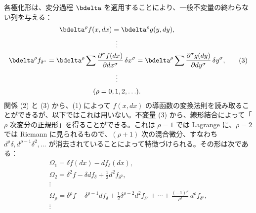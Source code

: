 各極化形は、変分過程 \(\bdelta\) を適用することにより、一般不変量の終わらない列を与える：
\begin{equation}
\begin{gathered}
\bdelta^\rho f(x,dx)=\bdelta^\rho g(y,dy),\\
\vdots\\
\bdelta^\rho f_{\delta^\sigma}
=\bdelta^\rho\sum\frac{\partial^\sigma f(dx)}{\partial dx^\sigma}\,
\delta x^\sigma
=\bdelta^\rho\sum\frac{\partial^\sigma g(dy)}{\partial dy^\sigma}\,
\delta y^\sigma,\\
\vdots\\[0.2em]
(\rho=0,1,2,\ldots).
\end{gathered}
\tag{3}
\end{equation}
関係 (2) と (3) から、(1) によって \(f(x,dx)\) の導函数の変換法則を読み取ることができるが、以下ではこれは用いない。不変量 (3) から、線形結合によって「\(\rho\) 次変分の正規形」を得ることができる。これは \(\rho=1\) では Lagrange に、\(\rho=2\) では Riemann に見られるもので、\((\rho+1)\) 次の混合微分、すなわち \(d^\rho\delta,d^{\rho-1}\delta^2,\ldots\) が消去されていることによって特徴づけられる。その形は次である：
\begin{equation}
\begin{gathered}
\Omega_1=\delta f(dx)-d f_\delta(dx),\\
\Omega_2=\delta^2 f-\delta d f_\delta+\frac12 d^2 f_{\delta^2},\\
\vdots\\
\Omega_\rho=\delta^\rho f-\delta^{\rho-1}d f_\delta
+\frac12\delta^{\rho-2}d^2 f_{\delta^2}
+\cdots+\frac{(-1)^\rho}{\rho!}\,d^\rho f_{\delta^\rho},\\
\vdots
\end{gathered}
\tag{4}
\end{equation}

